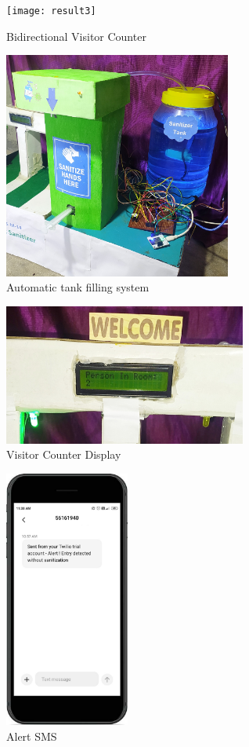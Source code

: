 	\begin{figure}[h]
		\centering
	\texttt{[image: result3]}
	\caption{Bidirectional Visitor Counter}
	\label{Bidirectional Visitor Counter}
	
\end{figure}

\vspace{1cm}
	\begin{figure}[h]
		\centering
	\includegraphics[width=75mm,scale=1]{result4}
	\caption{Automatic tank filling system}
	\label{Automatic tank filling system}
	
\end{figure}

\newpage

	\begin{figure}[h]
		\centering
	\includegraphics[width=80mm,scale=1]{result5}
	\caption{Visitor Counter Display}
	\label{Visitor Counter Display}
	
\end{figure}

\vspace{1cm}
	\begin{figure}[h]
		\centering
	\includegraphics[width=41mm,scale=1]{result6}
	\caption{Alert SMS}
	\label{Alert SMS}
	
\end{figure}

